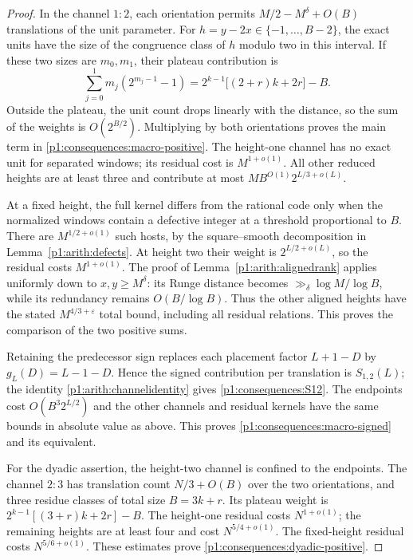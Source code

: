 \begin{proof}
In the channel $1:2$, each orientation permits
$M/2-M^\delta+O(B)$ translations of the unit parameter.
For $h=y-2x\in\{-1,\ldots,B-2\}$, the exact units have
the size of the congruence class of $h$ modulo two in this
interval. If these two sizes are $m_0,m_1$, their plateau
contribution is
\[
 \sum_{j=0}^1m_j(2^{m_j-1}-1)
       =2^{k-1}\big[(2+r)k+2r\big]-B.
\]
Outside the plateau, the unit count drops linearly with the
distance, so the sum of the weights is $O(2^{B/2})$.
Multiplying by both orientations proves the main term in
\eqref{p1:consequences:macro-positive}. The height-one
channel has no exact unit for separated windows; its residual
cost is $M^{1+o(1)}$. All other reduced heights are at least
three and contribute at most $M B^{O(1)}2^{L/3+o(L)}$.

At a fixed height, the full kernel differs from the rational
code only when the normalized windows contain a defective
integer at a threshold proportional to $B$. There are
$M^{1/2+o(1)}$ such hosts, by the square--smooth decomposition
in Lemma~\ref{p1:arith:defects}. At height two their weight
is $2^{L/2+o(L)}$, so the residual costs $M^{1+o(1)}$.
The proof of Lemma~\ref{p1:arith:alignedrank} applies uniformly
down to $x,y\ge M^\delta$: its Runge distance becomes
$\gg_\delta\log M/\log B$, while its redundancy remains
$O(B/\log B)$. Thus the other aligned heights have the
stated $M^{4/3+\varepsilon}$ total bound, including all
residual relations. This proves the comparison of the two
positive sums.

Retaining the predecessor sign replaces each placement factor
$L+1-D$ by $g_L(D)=L-1-D$. Hence the signed contribution
per translation is $S_{1,2}(L)$; the identity
\eqref{p1:arith:channelidentity} gives
\eqref{p1:consequences:S12}. The endpoints cost
$O(B^3 2^{L/2})$ and the other channels and residual kernels
have the same bounds in absolute value as above. This proves
\eqref{p1:consequences:macro-signed} and its equivalent.

For the dyadic assertion, the height-two channel is confined
to the endpoints. The channel $2:3$ has translation count
$N/3+O(B)$ over the two orientations, and three residue
classes of total size $B=3k+r$. Its plateau weight is
$2^{k-1}[(3+r)k+2r]-B$. The height-one residual costs
$N^{1+o(1)}$; the remaining heights are at least four and
cost $N^{5/4+o(1)}$. The fixed-height residual costs
$N^{5/6+o(1)}$. These estimates prove
\eqref{p1:consequences:dyadic-positive}.
\end{proof}

